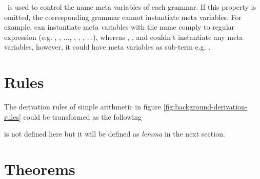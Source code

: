 \documentclass[master.tex]{subfiles}
\begin{document}
\kMetaVarRegex\ is used to control the name meta variables of each grammar. If
this property is omitted, the corresponding grammar cannot instantiate meta
variables. For example,  can instantiate meta variables with the name
comply to regular expression \pregex{\texttt{[a-z][0-9]*}} (e.g. , ,
$\ldots$, , , , $\ldots$), whereas ,
, and  couldn't instantiate any meta variables,
however, it could have meta variables as sub-term e.g. 
.

\section{Rules}

The derivation rules of simple arithmetic in figure \ref{fig:background-derivation-rules}
could be transformed as the following

 is not defined here but it will be defined as \emph{lemma}
in the next section.

\section{Theorems}
\end{document}
